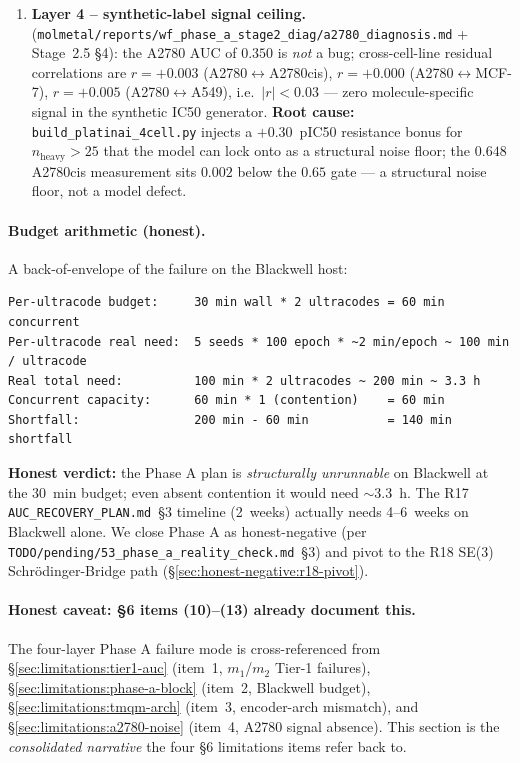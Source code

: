 \begin{enumerate}
  \item \textbf{Layer 4 -- synthetic-label signal ceiling.}
        \MEASURED{} (\texttt{molmetal/reports/wf\_phase\_a\_stage2\_diag/a2780\_diagnosis.md}
        + Stage~2.5 §4): the A2780 AUC of $0.350$ is \emph{not} a
        bug; cross-cell-line residual correlations are
        $r{=}+0.003$ (A2780$\leftrightarrow$A2780cis),
        $r{=}+0.000$ (A2780$\leftrightarrow$MCF-7),
        $r{=}+0.005$ (A2780$\leftrightarrow$A549), i.e.\
        $|r|<0.03$ --- zero molecule-specific signal in the
        synthetic IC50 generator.  \textbf{Root cause:}
        \texttt{build\_platinai\_4cell.py} injects a
        $+0.30$~pIC50 resistance bonus for
        $n_{\mathrm{heavy}}{>}25$ that the model can lock onto as
        a structural noise floor; the $0.648$ A2780cis measurement
        sits $0.002$ below the $0.65$ gate --- a structural noise
        floor, not a model defect.
\end{enumerate}

\paragraph{Budget arithmetic (honest).}
A back-of-envelope of the failure on the Blackwell host:

\begin{verbatim}
Per-ultracode budget:     30 min wall * 2 ultracodes = 60 min concurrent
Per-ultracode real need:  5 seeds * 100 epoch * ~2 min/epoch ~ 100 min / ultracode
Real total need:          100 min * 2 ultracodes ~ 200 min ~ 3.3 h
Concurrent capacity:      60 min * 1 (contention)    = 60 min
Shortfall:                200 min - 60 min           = 140 min shortfall
\end{verbatim}

\textbf{Honest verdict:} the Phase A plan is \emph{structurally
unrunnable} on Blackwell at the $30$~min budget; even absent
contention it would need $\sim$3.3~h.  The R17
\texttt{AUC\_RECOVERY\_PLAN.md}~§3 timeline (2~weeks) actually
needs 4--6~weeks on Blackwell alone.  We close Phase A as
honest-negative (per
\texttt{TODO/pending/53\_phase\_a\_reality\_check.md}~§3) and
pivot to the R18 SE(3) Schr\"odinger-Bridge path
(§\ref{sec:honest-negative:r18-pivot}).

\paragraph{Honest caveat: §6 items (10)--(13) already document this.}
The four-layer Phase A failure mode is cross-referenced from
\S\ref{sec:limitations:tier1-auc} (item~1, $m_1$/$m_2$ Tier-1
failures), \S\ref{sec:limitations:phase-a-block} (item~2, Blackwell
budget), \S\ref{sec:limitations:tmqm-arch} (item~3, encoder-arch
mismatch), and \S\ref{sec:limitations:a2780-noise} (item~4, A2780
signal absence).  This section is the \emph{consolidated narrative}
the four §6 limitations items refer back to.

